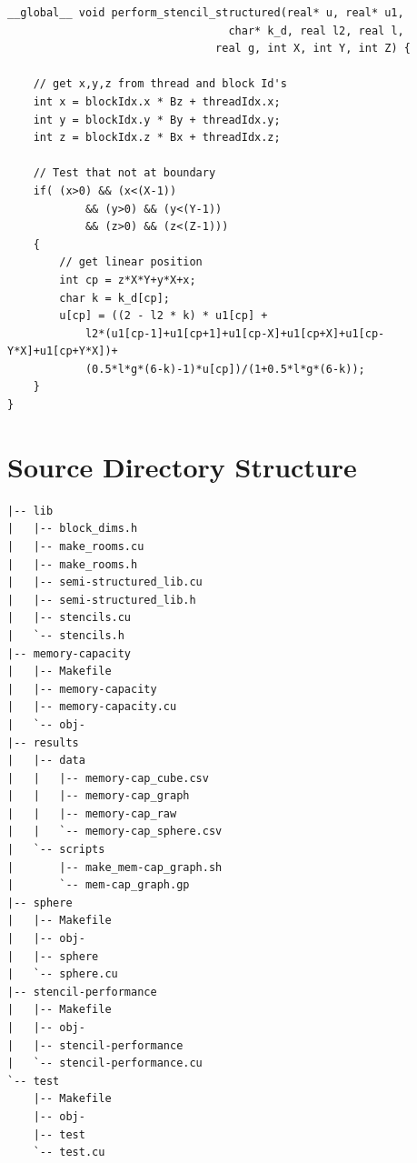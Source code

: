 \documentclass[12pt,a4paper]{report}
\begin{document}
\begin{minipage}{\linewidth}
\begin{lstlisting}
__global__ void perform_stencil_structured(real* u, real* u1, 
                                  char* k_d, real l2, real l, 
                                real g, int X, int Y, int Z) {

    // get x,y,z from thread and block Id's
    int x = blockIdx.x * Bz + threadIdx.x;
    int y = blockIdx.y * By + threadIdx.y;
    int z = blockIdx.z * Bx + threadIdx.z;

    // Test that not at boundary
    if( (x>0) && (x<(X-1))
            && (y>0) && (y<(Y-1))
            && (z>0) && (z<(Z-1)))
    {
        // get linear position
        int cp = z*X*Y+y*X+x;
        char k = k_d[cp];
        u[cp] = ((2 - l2 * k) * u1[cp] + 
            l2*(u1[cp-1]+u1[cp+1]+u1[cp-X]+u1[cp+X]+u1[cp-Y*X]+u1[cp+Y*X])+
            (0.5*l*g*(6-k)-1)*u[cp])/(1+0.5*l*g*(6-k));
    }
}

\end{lstlisting}
\end{minipage}

\chapter{Source Directory Structure}
\begin{lstlisting}
|-- lib
|   |-- block_dims.h
|   |-- make_rooms.cu
|   |-- make_rooms.h
|   |-- semi-structured_lib.cu
|   |-- semi-structured_lib.h
|   |-- stencils.cu
|   `-- stencils.h
|-- memory-capacity
|   |-- Makefile
|   |-- memory-capacity
|   |-- memory-capacity.cu
|   `-- obj-
|-- results
|   |-- data
|   |   |-- memory-cap_cube.csv
|   |   |-- memory-cap_graph
|   |   |-- memory-cap_raw
|   |   `-- memory-cap_sphere.csv
|   `-- scripts
|       |-- make_mem-cap_graph.sh
|       `-- mem-cap_graph.gp
|-- sphere
|   |-- Makefile
|   |-- obj-
|   |-- sphere
|   `-- sphere.cu
|-- stencil-performance
|   |-- Makefile
|   |-- obj-
|   |-- stencil-performance
|   `-- stencil-performance.cu
`-- test
    |-- Makefile
    |-- obj-
    |-- test
    `-- test.cu

\end{lstlisting}
\end{document}
